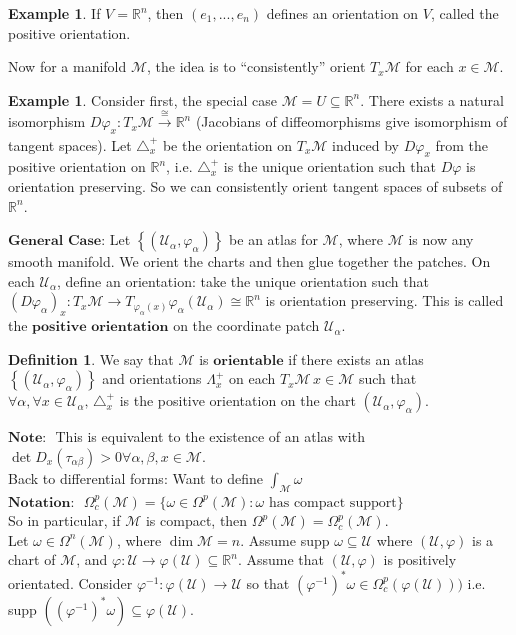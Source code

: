 \documentclass[10pt]{article}
\theoremstyle{plain}
\theoremstyle{definition}
\newtheorem{defn}[thm]{Definition} %
\newtheorem{exmp}[thm]{Example} %
\newcommand{\Notation}{\textbf{Notation: }}
\newcommand{\Note}{\textbf{Note: }}
\newcommand{\Real}{\mathbb{R}}
\newcommand{\man}{\mathcal{M}}
\newcommand{\chartU}{\mathcal{U}}
\newcommand{\chart}{\varphi}
\newcommand{\alphaatlas}{\left\{(\chartU_\alpha,\chart_\alpha)\right\}}
\newcommand{\trans}{\tau_{\alpha\beta}}
\newcommand{\xman}{x\in\man}
\newcommand{\allthe}[3]{{#1}_{#2},...,{#1}_{#3}}
\newcommand{\tang}{T_x\man}
\newcommand{\pformman}[1]{\Omega^{#1}(\man)}
\newcommand{\compactpformman}[1]{\Omega^{#1}_c(\man)}
\begin{document}
\begin{exmp}
If $V = \Real^n$, then $(\allthe{e}{1}{n})$ defines an orientation on $V$, called the positive orientation.
\end{exmp}\noindent
Now for a manifold $\man$, the idea is to ``consistently'' orient $\tang$ for each $\xman$. 
\begin{exmp}
Consider first, the special case $\man = U \subseteq \Real^n$. There exists a natural isomorphism $D\varphi _ x : \tang \xrightarrow[]{\cong} \Real^n$ (Jacobians of diffeomorphisms give isomorphism of tangent spaces). Let $\triangle_x^+$ be the orientation on $\tang$ induced by $D\varphi_x$ from the positive orientation on $\Real^n$, i.e. $\triangle_x^+$ is the unique orientation such that $D\varphi$ is orientation preserving. So we can consistently orient tangent spaces of subsets of $\Real^n$.
\end{exmp}\noindent
$\textbf{General Case:}$ Let $\alphaatlas$ be an atlas for $\man$, where $\man$ is now any smooth manifold. We orient the charts and then glue together the patches. On each $\chartU_\alpha$, define an orientation: take the unique orientation such that $(D\varphi_\alpha)_x : \tang \to T_{\varphi_\alpha(x)} \varphi_\alpha(\chartU_\alpha) \cong \Real^n$ is orientation preserving. This is called the $\textbf{positive orientation}$ on the coordinate patch $\chartU_\alpha$.
\begin{defn}
We say that $\man$ is $\textbf{orientable}$ if there exists an atlas $\alphaatlas$ and orientations $\Lambda_x^+$ on each $\tang\,\xman$ such that $\forall \alpha,\forall x \in \chartU_\alpha, \, \triangle_x^+$ is the positive orientation on the chart $(\chartU_\alpha,\varphi_\alpha)$.
\end{defn}
\noindent
$\Note$ This is equivalent to the existence of an atlas with $\det D_x(\trans)> 0 \forall \alpha, \beta, \xman$.\\
Back to differential forms: Want to define $\int_{\man} \omega$\\
$\Notation$ $\Omega^p_c(\man) = \{\omega \in \pformman{p} : \omega \text{ has compact support} \}$\\
So in particular, if $\man$ is compact, then $\pformman{p} = \compactpformman{p}$. \\
Let $\omega \in \pformman{n}$, where $\dim \man = n$. Assume supp $\omega \subseteq\chartU$ where $(\chartU,\chart)$ is a chart of $\man$, and $\chart : \chartU \to \chart(\chartU)\subseteq\Real^n$. Assume that $(\chartU,\chart)$ is positively orientated. Consider $\chart^{-1} : \chart(\chartU) \to \chartU$ so that $(\chart^{-1})^* \omega \in \Omega_c^p(\chart(\chartU)))  $ i.e. supp $((\chart^{-1})^*\omega)\subseteq\chart(\chartU).$
\end{document}
